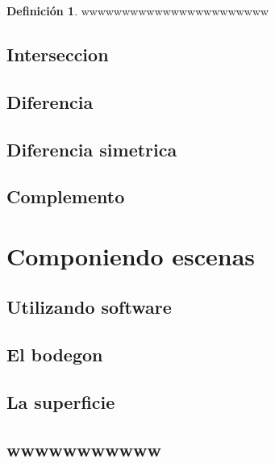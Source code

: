 \documentclass[
  16pt,
]{krantz}
\theoremstyle{definition}
\newtheorem{definition}{Definición}[chapter]
\theoremstyle{definition}
\theoremstyle{definition}
\theoremstyle{definition}
\theoremstyle{remark}
\begin{document}
\begin{definition}
\protect\hypertarget{def:unnamed-chunk-2}{}{\label{def:unnamed-chunk-2} }wwwwwwwwwwwwwwwwwwwwwww
\end{definition}

\hypertarget{interseccion}{%
\subsection{Interseccion}\label{interseccion}}

\hypertarget{diferencia}{%
\subsection{Diferencia}\label{diferencia}}

\hypertarget{diferencia-simetrica}{%
\subsection{Diferencia simetrica}\label{diferencia-simetrica}}

\hypertarget{complemento}{%
\subsection{Complemento}\label{complemento}}

\hypertarget{componiendo-escenas}{%
\section{Componiendo escenas}\label{componiendo-escenas}}

\hypertarget{utilizando-software}{%
\subsection{Utilizando software}\label{utilizando-software}}

\hypertarget{el-bodegon}{%
\subsection{El bodegon}\label{el-bodegon}}

\hypertarget{la-superficie}{%
\subsection{La superficie}\label{la-superficie}}

\hypertarget{wwwwwwwwwww}{%
\subsection{wwwwwwwwwww}\label{wwwwwwwwwww}}
\end{document}
